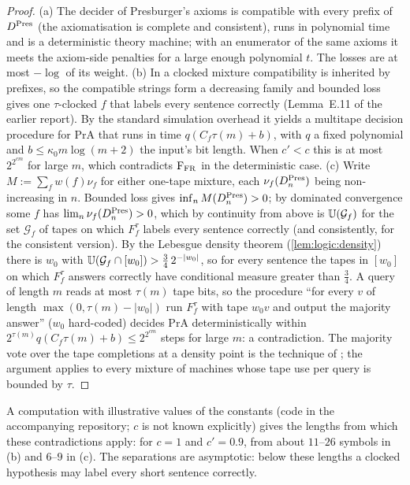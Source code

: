 \begin{proof}
(a) The decider of Presburger's axioms is compatible with every prefix of $D^{\rm Pres}$ (the axiomatisation is complete and consistent), runs in polynomial time and is a deterministic theory machine; with an enumerator of the same axioms it meets the axiom-side penalties for a large enough polynomial $t$. The losses are at most $-\log$ of its weight.
(b) In a clocked mixture compatibility is inherited by prefixes, so the compatible strings form a decreasing family and bounded loss gives one $\tau$-clocked $f$ that labels every sentence correctly (Lemma~E.11 of the earlier report). By the standard simulation overhead it yields a multitape decision procedure for $\mathrm{PrA}$ that runs in time $q(C_f\tau(m)+b)$, with $q$ a fixed polynomial and $b\le\kappa_0m\log(m+2)$ the input's bit length. When $c'<c$ this is at most $2^{2^{cm}}$ for large $m$, which contradicts $\mathrm F_{\rm FR}$ in the deterministic case.
(c) Write $M:=\sum_fw(f)\nu_f$ for either one-tape mixture, each $\nu_f(D^{\rm Pres}_n)$ being non-increasing in $n$. Bounded loss gives $\inf_nM(D^{\rm Pres}_n)>0$; by dominated convergence some $f$ has $\lim_n\nu_f(D^{\rm Pres}_n)>0$, which by continuity from above is $\mathbb{U}(\mathcal G_f)$ for the set $\mathcal G_f$ of tapes on which $F^\tau_f$ labels every sentence correctly (and consistently, for the consistent version). By the Lebesgue density theorem (\cref{lem:logic:density}) there is $w_0$ with $\mathbb{U}(\mathcal G_f\cap[w_0])>\frac34\,2^{-\lvert w_0\rvert}$, so for every sentence the tapes in $[w_0]$ on which $F^\tau_f$ answers correctly have conditional measure greater than $\frac34$. A query of length $m$ reads at most $\tau(m)$ tape bits, so the procedure ``for every $v$ of length $\max(0,\tau(m)-\lvert w_0\rvert)$ run $F^\tau_f$ with tape $w_0v$ and output the majority answer'' ($w_0$ hard-coded) decides $\mathrm{PrA}$ deterministically within $2^{\tau(m)}q(C_f\tau(m)+b)\le2^{2^{cm}}$ steps for large $m$: a contradiction. The majority vote over the tape completions at a density point is the technique of \citet{deleeuw1956computability}; the argument applies to every mixture of machines whose tape use per query is bounded by $\tau$.
\end{proof}

A computation with illustrative values of the constants (code in the accompanying repository; $c$ is not known explicitly) gives the lengths from which these contradictions apply: for $c=1$ and $c'=0.9$, from about $11$--$26$ symbols in (b) and $6$--$9$ in (c). The separations are asymptotic: below these lengths a clocked hypothesis may label every short sentence correctly.

